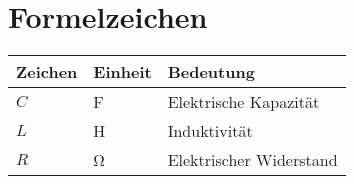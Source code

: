 \section*{Formelzeichen}
\setlength{\ltfix}{\dimexpr\textwidth-6\tabcolsep\relax}
\begin{longtable}{p{0.2\ltfix}p{0.15\ltfix}p{0.65\ltfix}}
    \toprule
    \textbf{Zeichen}  & \textbf{Einheit}  & \textbf{Bedeutung}\\
    \midrule \endhead%
    \midrule \endfoot%
    \bottomrule \endlastfoot%
    \(C\)                   & \si{\farad}       & Elektrische Kapazität\\
    \(L\)                   & \si{\henry}       & Induktivität\\
    \(R\)                   & \si{\ohm}         & Elektrischer Widerstand\\
\end{longtable}
